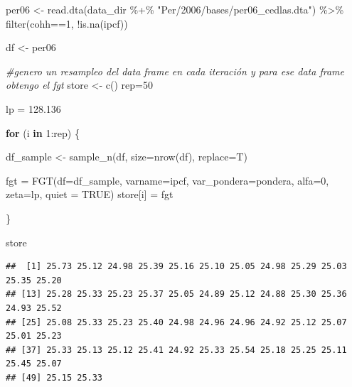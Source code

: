 \documentclass[
]{book}
\newenvironment{Shaded}{\begin{snugshade}}{\end{snugshade}}
\newcommand{\AttributeTok}[1]{\textcolor[rgb]{0.77,0.63,0.00}{#1}}
\newcommand{\CommentTok}[1]{\textcolor[rgb]{0.56,0.35,0.01}{\textit{#1}}}
\newcommand{\ConstantTok}[1]{\textcolor[rgb]{0.00,0.00,0.00}{#1}}
\newcommand{\ControlFlowTok}[1]{\textcolor[rgb]{0.13,0.29,0.53}{\textbf{#1}}}
\newcommand{\DecValTok}[1]{\textcolor[rgb]{0.00,0.00,0.81}{#1}}
\newcommand{\FloatTok}[1]{\textcolor[rgb]{0.00,0.00,0.81}{#1}}
\newcommand{\FunctionTok}[1]{\textcolor[rgb]{0.00,0.00,0.00}{#1}}
\newcommand{\NormalTok}[1]{#1}
\newcommand{\OtherTok}[1]{\textcolor[rgb]{0.56,0.35,0.01}{#1}}
\newcommand{\SpecialCharTok}[1]{\textcolor[rgb]{0.00,0.00,0.00}{#1}}
\newcommand{\StringTok}[1]{\textcolor[rgb]{0.31,0.60,0.02}{#1}}
\begin{document}
\begin{Shaded}
\begin{Highlighting}[]
\NormalTok{per06 }\OtherTok{\textless{}{-}} \FunctionTok{read.dta}\NormalTok{(data\_dir }\SpecialCharTok{\%+\%} \StringTok{"Per/2006/bases/per06\_cedlas.dta"}\NormalTok{) }\SpecialCharTok{\%\textgreater{}\%} 
        \FunctionTok{filter}\NormalTok{(cohh}\SpecialCharTok{==}\DecValTok{1}\NormalTok{, }\SpecialCharTok{!}\FunctionTok{is.na}\NormalTok{(ipcf))}

\NormalTok{df }\OtherTok{\textless{}{-}}\NormalTok{ per06}

\CommentTok{\#genero un resampleo del data frame en cada iteración y para ese data frame obtengo el fgt}
\NormalTok{store }\OtherTok{\textless{}{-}} \FunctionTok{c}\NormalTok{()}
\NormalTok{rep}\OtherTok{=}\DecValTok{50}

\NormalTok{lp }\OtherTok{=} \FloatTok{128.136}

\ControlFlowTok{for}\NormalTok{ (i }\ControlFlowTok{in} \DecValTok{1}\SpecialCharTok{:}\NormalTok{rep) \{}
  
\NormalTok{   df\_sample }\OtherTok{\textless{}{-}} \FunctionTok{sample\_n}\NormalTok{(df, }\AttributeTok{size=}\FunctionTok{nrow}\NormalTok{(df), }\AttributeTok{replace=}\NormalTok{T)}
   
\NormalTok{   fgt }\OtherTok{=} \FunctionTok{FGT}\NormalTok{(}\AttributeTok{df=}\NormalTok{df\_sample, }\AttributeTok{varname=}\NormalTok{ipcf, }\AttributeTok{var\_pondera=}\NormalTok{pondera, }\AttributeTok{alfa=}\DecValTok{0}\NormalTok{, }\AttributeTok{zeta=}\NormalTok{lp, }\AttributeTok{quiet =} \ConstantTok{TRUE}\NormalTok{)}
\NormalTok{   store[i] }\OtherTok{=}\NormalTok{ fgt}
   
\NormalTok{\}}
\end{Highlighting}
\end{Shaded}

\begin{Shaded}
\begin{Highlighting}[]
\NormalTok{store}
\end{Highlighting}
\end{Shaded}

\begin{verbatim}
##  [1] 25.73 25.12 24.98 25.39 25.16 25.10 25.05 24.98 25.29 25.03 25.35 25.20
## [13] 25.28 25.33 25.23 25.37 25.05 24.89 25.12 24.88 25.30 25.36 24.93 25.52
## [25] 25.08 25.33 25.23 25.40 24.98 24.96 24.96 24.92 25.12 25.07 25.01 25.23
## [37] 25.33 25.13 25.12 25.41 24.92 25.33 25.54 25.18 25.25 25.11 25.45 25.07
## [49] 25.15 25.33
\end{verbatim}
\end{document}
